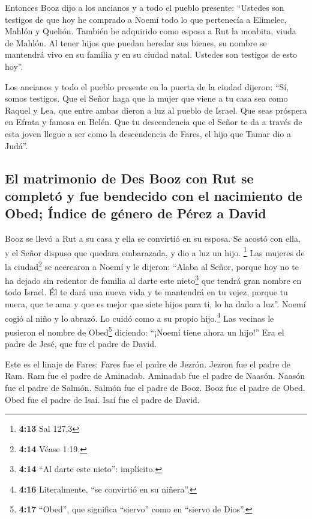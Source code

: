  Entonces Booz dijo a los ancianos y a todo el pueblo
presente: ``Ustedes son testigos de que hoy he comprado a Noemí todo lo
que pertenecía a Elimelec, Mahlón y Quelión.  También he
adquirido como esposa a Rut la moabita, viuda de Mahlón. Al tener hijos
que puedan heredar sus bienes, su nombre se mantendrá vivo en su familia
y en su ciudad natal. Ustedes son testigos de esto hoy''.

 Los ancianos y todo el pueblo presente en la puerta de
la ciudad dijeron: ``Sí, somos testigos. Que el Señor haga que la mujer
que viene a tu casa sea como Raquel y Lea, que entre ambas dieron a luz
al pueblo de Israel. Que seas próspera en Efrata y famosa en Belén.
 Que tu descendencia que el Señor te da a través de esta
joven llegue a ser como la descendencia de Fares, el hijo que Tamar dio
a Judá''.

\hypertarget{el-matrimonio-de-des-booz-con-rut-se-completuxf3-y-fue-bendecido-con-el-nacimiento-de-obed-uxedndice-de-guxe9nero-de-puxe9rez-a-david}{%
\subsection{El matrimonio de Des Booz con Rut se completó y fue
bendecido con el nacimiento de Obed; Índice de género de Pérez a
David}\label{el-matrimonio-de-des-booz-con-rut-se-completuxf3-y-fue-bendecido-con-el-nacimiento-de-obed-uxedndice-de-guxe9nero-de-puxe9rez-a-david}}

 Booz se llevó a Rut a su casa y ella se convirtió en su
esposa. Se acostó con ella, y el Señor dispuso que quedara embarazada, y
dio a luz un hijo. \footnote{\textbf{4:13} Sal 127,3} 
Las mujeres de la ciudad\footnote{\textbf{4:14} Véase 1:19.} se
acercaron a Noemí y le dijeron: ``Alaba al Señor, porque hoy no te ha
dejado sin redentor de familia al darte este nieto\footnote{\textbf{4:14}
  ``Al darte este nieto'': implícito.} que tendrá gran nombre en todo
Israel.  Él te dará una nueva vida y te mantendrá en tu
vejez, porque tu nuera, que te ama y que es mejor que siete hijos para
ti, lo ha dado a luz''.  Noemí cogió al niño y lo abrazó.
Lo cuidó como a su propio hijo.\footnote{\textbf{4:16} Literalmente,
  ``se convirtió en su niñera''.}  Las vecinas le
pusieron el nombre de Obed\footnote{\textbf{4:17} ``Obed'', que
  significa ``siervo'' como en ``siervo de Dios''.} diciendo: ``¡Noemí
tiene ahora un hijo!'' Era el padre de Jesé, que fue el padre de David.

 Este es el linaje de Fares: Fares fue el padre de
Jezrón.  Jezron fue el padre de Ram. Ram fue el padre de
Aminadab.  Aminadab fue el padre de Naasón. Naasón fue el
padre de Salmón.  Salmón fue el padre de Booz. Booz fue
el padre de Obed.  Obed fue el padre de Isaí. Isaí fue el
padre de David.
